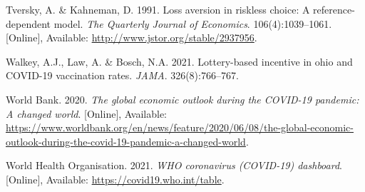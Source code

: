 \documentclass[11pt,preprint, authoryear]{elsarticle}
\numberwithin{equation}{section}
\numberwithin{figure}{section}
\numberwithin{table}{section}
\newlength{\cslhangindent}
\newenvironment{CSLReferences}%
  {\setlength{\parindent}{0pt}%
  \everypar{\setlength{\hangindent}{\cslhangindent}}\ignorespaces}%
  {\par}
\begin{document}
\begin{CSLReferences}{1}{0}
\leavevmode\hypertarget{ref-ref}{}%
Tversky, A. \& Kahneman, D. 1991. Loss aversion in riskless choice: A
reference-dependent model. \emph{The Quarterly Journal of Economics}.
106(4):1039--1061. {[}Online{]}, Available:
\url{http://www.jstor.org/stable/2937956}.

\leavevmode\hypertarget{ref-ohio}{}%
Walkey, A.J., Law, A. \& Bosch, N.A. 2021. Lottery-based incentive in
ohio and COVID-19 vaccination rates. \emph{JAMA}. 326(8):766--767.

\leavevmode\hypertarget{ref-bank}{}%
World Bank. 2020. \emph{The global economic outlook during the COVID-19
pandemic: A changed world}. {[}Online{]}, Available:
\url{https://www.worldbank.org/en/news/feature/2020/06/08/the-global-economic-outlook-during-the-covid-19-pandemic-a-changed-world}.

\leavevmode\hypertarget{ref-who}{}%
World Health Organisation. 2021. \emph{WHO coronavirus (COVID-19)
dashboard}. {[}Online{]}, Available:
\url{https://covid19.who.int/table}.

\end{CSLReferences}


\end{document}
